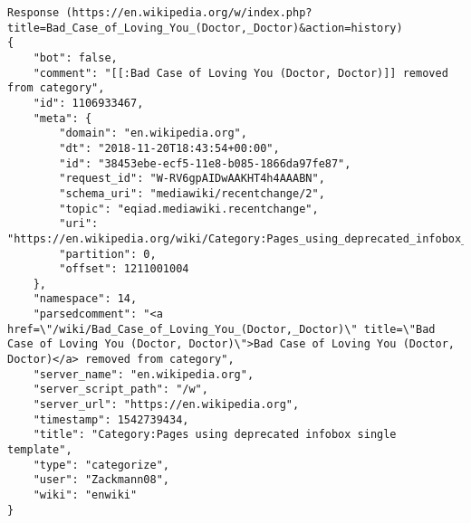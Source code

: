 \begin{lstlisting}
Response (https://en.wikipedia.org/w/index.php?title=Bad_Case_of_Loving_You_(Doctor,_Doctor)&action=history)
{
	"bot": false,
	"comment": "[[:Bad Case of Loving You (Doctor, Doctor)]] removed from category",
	"id": 1106933467,
	"meta": {
		"domain": "en.wikipedia.org",
		"dt": "2018-11-20T18:43:54+00:00",
		"id": "38453ebe-ecf5-11e8-b085-1866da97fe87",
		"request_id": "W-RV6gpAIDwAAKHT4h4AAABN",
		"schema_uri": "mediawiki/recentchange/2",
		"topic": "eqiad.mediawiki.recentchange",
		"uri": "https://en.wikipedia.org/wiki/Category:Pages_using_deprecated_infobox_single_template",
		"partition": 0,
		"offset": 1211001004
	},
	"namespace": 14,
	"parsedcomment": "<a href=\"/wiki/Bad_Case_of_Loving_You_(Doctor,_Doctor)\" title=\"Bad Case of Loving You (Doctor, Doctor)\">Bad Case of Loving You (Doctor, Doctor)</a> removed from category",
	"server_name": "en.wikipedia.org",
	"server_script_path": "/w",
	"server_url": "https://en.wikipedia.org",
	"timestamp": 1542739434,
	"title": "Category:Pages using deprecated infobox single template",
	"type": "categorize",
	"user": "Zackmann08",
	"wiki": "enwiki"
}
\end{lstlisting}
